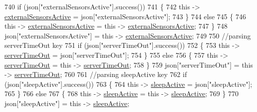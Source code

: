 \begin{DoxyCode}
740             \textcolor{keywordflow}{if} (json[\textcolor{stringliteral}{"externalSensorsActive"}].success())
741             \{
742                 \textcolor{keyword}{this} -> \hyperlink{classCoolBoard_a638b00b76aeb819ecfd4c10b8cdd7bb7}{externalSensorsActive} = json[\textcolor{stringliteral}{"externalSensorsActive"}];
743             \}
744             \textcolor{keywordflow}{else}
745             \{
746                 \textcolor{keyword}{this} -> \hyperlink{classCoolBoard_a638b00b76aeb819ecfd4c10b8cdd7bb7}{externalSensorsActive} = \textcolor{keyword}{this} -> 
      \hyperlink{classCoolBoard_a638b00b76aeb819ecfd4c10b8cdd7bb7}{externalSensorsActive};
747             \}
748             json[\textcolor{stringliteral}{"externalSensorsActive"}] = \textcolor{keyword}{this} -> \hyperlink{classCoolBoard_a638b00b76aeb819ecfd4c10b8cdd7bb7}{externalSensorsActive};
749 
750             \textcolor{comment}{//parsing serverTimeOut key}
751             \textcolor{keywordflow}{if} (json[\textcolor{stringliteral}{"serverTimeOut"}].success())
752             \{
753                 \textcolor{keyword}{this} -> \hyperlink{classCoolBoard_a7a8d8d3d316220cdd049cd63c1aa8fe6}{serverTimeOut} = json[\textcolor{stringliteral}{"serverTimeOut"}];
754             \}
755             \textcolor{keywordflow}{else}
756             \{
757                 \textcolor{keyword}{this} -> \hyperlink{classCoolBoard_a7a8d8d3d316220cdd049cd63c1aa8fe6}{serverTimeOut} = \textcolor{keyword}{this} -> \hyperlink{classCoolBoard_a7a8d8d3d316220cdd049cd63c1aa8fe6}{serverTimeOut};
758             \}
759             json[\textcolor{stringliteral}{"serverTimeOut"}] = \textcolor{keyword}{this} -> \hyperlink{classCoolBoard_a7a8d8d3d316220cdd049cd63c1aa8fe6}{serverTimeOut};
760             
761             \textcolor{comment}{//parsing sleepActive key}
762             \textcolor{keywordflow}{if} (json[\textcolor{stringliteral}{"sleepActive"}].success())
763             \{
764                 \textcolor{keyword}{this} -> \hyperlink{classCoolBoard_a0a51b2287139f66c738101fb53139230}{sleepActive} = json[\textcolor{stringliteral}{"sleepActive"}];
765             \}
766             \textcolor{keywordflow}{else}
767             \{
768                 \textcolor{keyword}{this} -> \hyperlink{classCoolBoard_a0a51b2287139f66c738101fb53139230}{sleepActive} = \textcolor{keyword}{this} -> \hyperlink{classCoolBoard_a0a51b2287139f66c738101fb53139230}{sleepActive};
769             \}
770             json[\textcolor{stringliteral}{"sleepActive"}] = \textcolor{keyword}{this} -> \hyperlink{classCoolBoard_a0a51b2287139f66c738101fb53139230}{sleepActive};

\end{DoxyCode}
